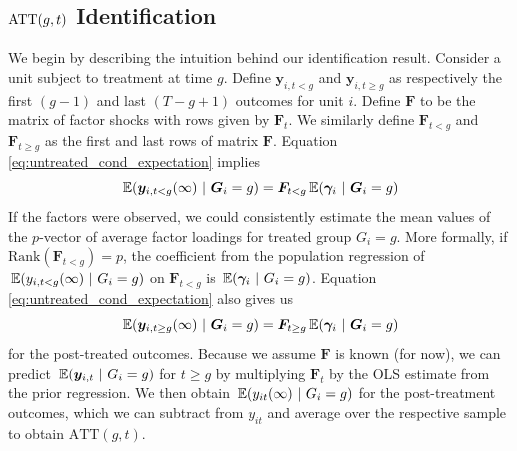 \documentclass[12pt]{article}
\begin{document}
\subsection{\texorpdfstring{$\text{ATT}(g,t)$}{ATT(g,t)} Identification}\label{sec:ATT_identification}

We begin by describing the intuition behind our identification result. Consider a unit subject to treatment at time $g$. Define $\bm y_{i,t<g}$ and $\bm y_{i,t\geq g}$ as respectively the first $(g-1)$ and last $(T-g+1)$ outcomes for unit $i$. Define $\bm{F}$ to be the matrix of factor shocks with rows given by $\bm{F}_t$. We similarly define $\bm{F}_{t < g}$ and $\bm{F}_{t \geq g}$ as the first and last rows of matrix $\bm{F}$. Equation \eqref{eq:untreated_cond_expectation} implies
\begin{equation}
  \expec{\bm y_{i,t < g}(\infty)}{ \bm G_i = g} = \bm{F}_{t < g} \expec{\bm \gamma_i}{\bm G_i = g}
\end{equation}
If the factors were observed, we could consistently estimate the mean values of the $p$-vector of average factor loadings for treated group $G_i = g$. More formally, if $\text{Rank}(\bm{F}_{t < g}) = p$, the coefficient from the population regression of $\expec{y_{i,t < g}(\infty) }{ G_i = g}$ on $\bm{F}_{t < g}$ is $\expec{\bm \gamma_i}{G_i = g}$. Equation \eqref{eq:untreated_cond_expectation} also gives us 
\begin{equation}
  \expec{\bm y_{i,t \geq g}(\infty)}{ \bm G_i = g} = \bm{F}_{t \geq g} \expec{\bm \gamma_i}{\bm G_i = g}
\end{equation}
for the post-treated outcomes. Because we assume $\bm{F}$ is known (for now), we can predict $\expec{\bm y_{i,t}}{G_i = g}$ for $t \geq g$ by multiplying $\bm{F}_t$  by the OLS estimate from the prior regression. We then obtain $\expec{y_{it}(\infty)}{G_i = g}$ for the post-treatment outcomes, which we can subtract from $y_{i t}$ and average over the respective sample to obtain $\text{ATT}(g,t)$. 
\end{document}
